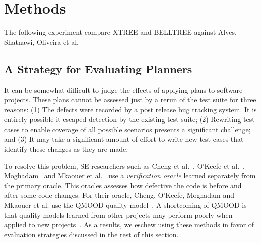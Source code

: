 \section{ Methods}
\label{sect:prelim}

The following experiment compare XTREE and BELLTREE against  
Alves, Shatnawi, Oliveira et al.  




\subsection{A Strategy for Evaluating Planners}

It can be somewhat difficult to judge the effects of applying plans
to software projects. These plans cannot be assessed just by a rerun of the test suite for three reasons: (1) The defects were recorded by a post release bug tracking system. It is entirely possible it escaped detection by the existing test suite; (2) Rewriting test cases to enable coverage of all possible scenarios presents a significant challenge; and (3) It may take a significant amount of effort to write new test cases that identify these changes as they are made.

To resolve this problem, SE researchers such as
Cheng et al.~\citep{Cheng10}, O'Keefe et al.~\citep{OKeeffe08, OKeeffe07}, 
Moghadam~\citep{Moghadam2011} and Mkaouer et al.~\citep{Mkaouer14}
use a {\em verification oracle} learned separately from the primary oracle. This oracles assesses how defective the code is before and after some code changes. For their oracle, Cheng, O'Keefe, Moghadam and Mkaouer et al. use the QMOOD quality model~\citep{Bansiya02}. A shortcoming of QMOOD is that quality models learned from other projects may perform poorly when applied to new projects~\citep{localvsglobal}. As a results, we eschew using these methods in favor of evaluation strategies discussed in the rest of this section.



